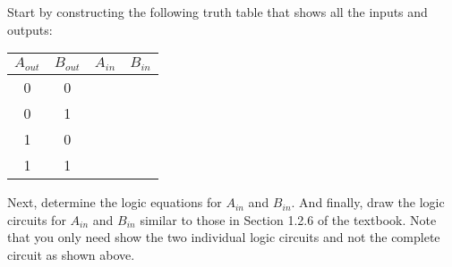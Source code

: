 \documentclass[letterpaper,12pt,fleqn]{article}
\begin{document}
Start by constructing the following truth table that shows all the inputs and outputs:

\begin{center}
  \begin{tabular}{cc|cc}
    \(A_{out}\) & \(B_{out}\) & \(A_{in}\) & \(B_{in}\) \\
    \hline
    0 & 0 & & \\
    0 & 1 & & \\
    1 & 0 & & \\
    1 & 1 & &
  \end{tabular}
\end{center}

Next, determine the logic equations for \(A_{in}\) and \(B_{in}\).  And finally, draw the logic circuits for
\(A_{in}\) and \(B_{in}\) similar to those in Section 1.2.6 of the textbook.  Note that you only need show the two
individual logic circuits and not the complete circuit as shown above.
\end{document}
